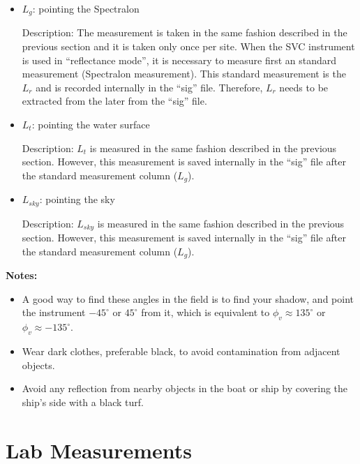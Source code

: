 \begin{appendices}
\begin{itemize}[itemsep=2pt,parsep=2pt]
	\item $L_g$: pointing the Spectralon

Description: The measurement is taken in the same fashion described in the previous section and it is taken only once per site. When the SVC instrument is used in ``reflectance mode'', it is necessary to measure first an standard measurement (Spectralon measurement). This standard measurement is the $L_r$ and is recorded internally in the ``sig'' file. Therefore, $L_r$ needs to be extracted from the later from the ``sig'' file. 

	\item $L_t$: pointing the water surface

Description: $L_t$ is measured in the same fashion described in the previous section. However, this measurement is saved internally in the ``sig'' file after the standard measurement column ($L_g$).

	\item $L_{sky}$: pointing the sky	

Description: $L_{sky}$ is measured in the same fashion described in the previous section. However, this measurement is saved internally in the ``sig'' file after the standard measurement column ($L_g$).

\end{itemize}
{\bf Notes:}
\begin{itemize}[itemsep=2pt,parsep=2pt]
  \item A good way to find these angles in the field is to find your shadow, and point the instrument $-45^\circ$ or $45^\circ$ from it, which is equivalent to $\phi_v \approx 135^\circ$ or $\phi_v \approx -135^\circ$.

	\item Wear dark clothes, preferable black, to avoid contamination from adjacent objects.

	\item Avoid any reflection from nearby objects in the boat or ship by covering the ship's side with a black turf. 
\end{itemize}



\chapter{Lab Measurements}
\label{ch:labmea} 


\end{appendices}

